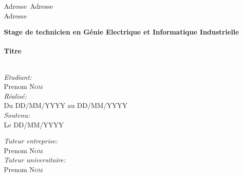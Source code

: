 \begin{titlepage}
\begin{minipage}[t]{0.462\textwidth}
\begin{flushright}
            Adresse\
            Adresse\\
            Adresse
        \end{flushright}
    \end{minipage}


    \begin{center}
        \vfill
        
        { \Huge \bfseries Stage de technicien en Génie Electrique et Informatique Industrielle}\\[0.5cm]
        \HRule \\[0.2cm]
        { \huge \bfseries Titre}\\[0.4cm] %
        \HRule \\[2cm]

        \begin{minipage}{0.462\textwidth}
            \begin{flushleft}
                \emph{Etudiant:}\\
                Prenom \textsc{Nom}\\[0.3cm]
                
                \emph{Réalisé:}\\
                Du DD/MM/YYYY au DD/MM/YYYY\\[0.3cm]
                
                \emph{Soutenu:}\\
                Le DD/MM/YYYY
            \end{flushleft}
        \end{minipage}
        \begin{minipage}{0.462\textwidth}
            \begin{flushright}
                \emph{Tuteur entreprise:}\\
                Prenom \textsc{Nom}\\[0.3cm]

                \emph{Tuteur universitaire:}\\
                Prenom \textsc{Nom}
            \end{flushright}
        \end{minipage}\\[1cm]
    

\end{center}
\end{titlepage}
